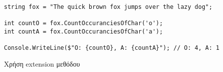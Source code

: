 \begin{listing}[htbp]
\begin{verbatim}
string fox = "The quick brown fox jumps over the lazy dog";

int countO = fox.CountOccuranciesOfChar('o');
int countA = fox.CountOccuranciesOfChar('a');

Console.WriteLine($"O: {countO}, A: {countA}"); // O: 4, A: 1
\end{verbatim}
\caption{Χρήση extension μεθόδου}
\label{extensionExec}
\end{listing}